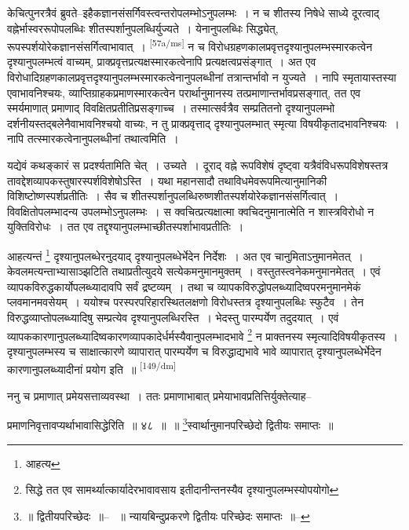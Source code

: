 \documentclass[article,12pt,a4paper]{memoir}
\begin{document}
	  \pstart केचित्पुनरत्रैवं ब्रुवते--इहैकज्ञानसंसर्गिवस्त्वन्तरोपलम्भोऽनुपलम्भः । न च शीतस्य निषेधे साध्ये दूरत्वाद् वह्नेर्भास्वररूपोपलब्धिः शीतस्पर्शानुपलब्धिर्युज्यते । येनानुपलब्धिः सिद्ध्येत्, रूपस्पर्शयोरेकज्ञानसंसर्गित्वाभावात् । \leavevmode\textsuperscript{\rmlatinfont\tiny [57a/ms]} न च विरोधग्रहणकालप्रवृत्तदृश्यानुपलम्भस्मारकत्वेन दृश्यानुपलम्भत्वं वाच्यम्, प्राक्प्रवृत्तप्रत्यक्षस्मारकत्वेनापि प्रत्यक्षत्वप्रसंङ्गात् । अत एव विरोधादिग्रहणकालप्रवृत्तदृश्यानुपलम्भस्मारकत्वेनानुपलब्धीनां तत्रान्तर्भावो न युज्यते । नापि स्मृतायास्तस्या एवाभावनिश्चयः, व्याप्तिग्राहकप्रमाणस्मारकत्वेन परार्थानुमानस्य तत्प्रमाणान्तर्भावप्रसङ्गात्, तत एव स्मर्यमाणात् प्रमाणाद् विवक्षितप्रतीतिप्रसङ्गाच्च । तस्मात्सर्वत्रैव सम्प्रतितनो दृश्यानुपलम्भो दर्शनीयस्तद्बलेनैवाभावनिश्चयो वाच्यः, न तु प्राक्प्रवृत्ताद् दृश्यानुपलम्भात् स्मृत्या विषयीकृतादभावनिश्चयः । नापि तत्स्मारकत्वेनानुपलब्धीनां तथात्वमिति ।
	\pend
      

	  \pstart यद्येवं कथङ्कारं स प्रदर्श्यतामिति चेत् । उच्यते । दूराद् वह्ने रूपविशेषं दृष्ट्वा यत्रैवंविधरूपविशेषस्तत्र तावद्देशव्यापकस्तुषारस्पर्शविशेषोऽस्ति । यथा महानसादौ तथाविधमेवरूपमित्यानुमानिकी विशिष्टोष्णस्पर्शप्रतीतिः । सैव च शीतस्पर्शानुपलब्धिरुष्णशीतस्पर्शयोरेकज्ञानसंसर्गित्वात् । विवक्षितोपलम्भादन्य उपलम्भोऽनुपलम्भः । स क्वचित्प्रत्यक्षात्मा क्वचिदनुमानात्मेति न शास्त्रविरोधो न युक्तिविरोधः । तत एव तद्दृश्यानुपलम्भाच्छीतस्पर्शाभावप्रतीतिः ।
	\pend
      

	  \pstart आहत्यन्तं \footnote{आहत्य} दृश्यानुपलब्धेरनुदयाद् दृश्यानुपलब्धेर्भेदेन निर्देशः । अत एव चानुमिताऽनुमानमेतत् । केवलमत्यन्ताभ्यासाञ्झटिति तथाप्रतीत्युदये सत्येकमनुमानमुक्तम् । वस्तुतस्त्वनेकमनुमानमेतत् । एवं व्यापकविरुद्धकार्योपलब्ध्यादावपि सर्वं द्रष्टव्यम् । तथा च व्यापकविरुद्धोपलब्ध्यादिष्वपरमनुमानमेकं प्लवमानमवसेयम् । ययोश्च परस्परपरिहारस्थितलक्षणो विरोधस्तत्र दृश्यानुपलब्धिः स्फुटैव । तेन विरुद्धव्याप्तोपलब्ध्यादिषु सम्प्रत्येव दृश्यानुपलब्धिरस्ति । भेदस्तु पारम्पर्येण तदुदयात् । एवं व्यापककारणानुपलब्ध्यादिष्वकारणव्यापकादेर्धर्मस्यैवानुपलम्भादभावे \footnote{सिद्धे तत एव सामर्थ्यात्कार्यादेरभावावसाय इतीदानीन्तनस्यैव दृश्यानुपलम्भस्योपयोगो} न प्राक्तनस्य स्मृत्यादिविषयीकृतस्य । दृश्यानुपलम्भस्य च साक्षात्कारणे व्यापारात् पारम्पर्येण च विरुद्धाद्यभावे भावे व्यापारात् दृश्यानुपलब्धेर्भेदेन कारणानुपलब्ध्यादीनां प्रयोग इति ॥
	\pend
      \leavevmode\textsuperscript{\rmlatinfont\tiny [149/dm]}

	  \pstart ननु च प्रमाणात् प्रमेयसत्ताव्यवस्था । ततः प्रमाणाभाबात् प्रमेयाभावप्रतित्तिर्युक्तेत्याह--
	\pend
       

	  \pstart प्रमाणनिवृत्तावप्यर्थाभावासिद्धेरिति ॥ ४८ ॥ ॥ \footnote{॥ द्वितीयपरिच्छेदः ॥--\cite{dp-msD} \cite{dp-msB} ॥ न्यायबिन्दुप्रकरणे द्वितीयः परिच्छेदः समाप्तः ॥--\cite{dp-edE}}स्वार्थानुमानपरिच्छेदो द्वितीयः समाप्तः ॥
	\pend
       
\end{document}
